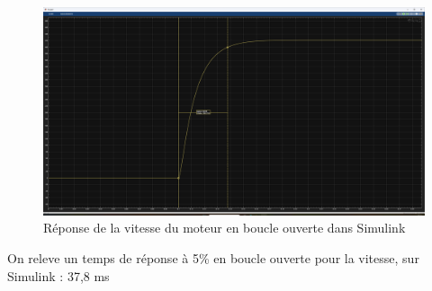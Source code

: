 \begin{figure}[H]
    \centering
    \includegraphics[width=1\textwidth]{images/asserv_de_vitesse_tachy/Vitesse_tr5_BO.png}
    \caption{Réponse de la vitesse du moteur en boucle ouverte dans Simulink}
    \label{fig:asservissement_vitesse_simulink}
\end{figure}
On releve un temps de réponse à 5\% en boucle ouverte pour la vitesse, sur Simulink : 37,8 ms

